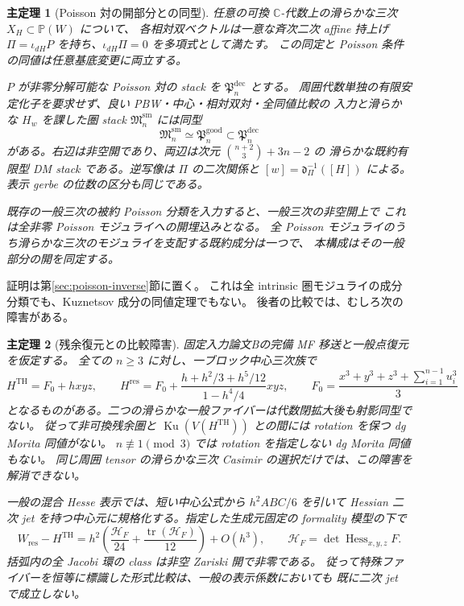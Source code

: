 \documentclass[11pt,a4paper]{ltjsarticle}
\numberwithin{equation}{section}
\newtheorem{maintheorem}{主定理}
\newcommand{\C}{\mathbb C}
\newcommand{\PP}{\mathbb P}
\begin{document}
\begin{maintheorem}[Poisson 対の開部分との同型]
任意の可換 $\C$-代数上の滑らかな三次 $X_H\subset\PP(W)$ について、
各相対双ベクトルは一意な斉次二次 affine 持上げ
$\Pi=\iota_{dH}P$ を持ち、$\iota_{dH}\Pi=0$ を多項式として満たす。
この同定と Poisson 条件の同値は任意基底変更に両立する。

$P$ が非零分解可能な Poisson 対の stack を $\mathfrak P_n^{\mathrm{dec}}$ とする。
周囲代数単独の有限安定化子を要求せず、良い PBW・中心・相対双対・全同値比較の
入力と滑らかな $H_w$ を課した圏 stack $\mathfrak M_n^{\mathrm{sm}}$ には同型
\[
 \mathfrak M_n^{\mathrm{sm}}\simeq
 \mathfrak P_n^{\mathrm{good}}\subset\mathfrak P_n^{\mathrm{dec}}
\]
がある。右辺は非空開であり、両辺は次元 $\binom{n+2}{3}+3n-2$ の
滑らかな既約有限型 DM stack である。逆写像は $\Pi$ の二次関係と
$[w]=\mathfrak d_\Pi^{-1}([H])$ による。表示 gerbe の位数の区分も同じである。

既存の一般三次の被約 Poisson 分類を入力すると、一般三次の非空開上で
これは全非零 Poisson モジュライへの開埋込みとなる。
全 Poisson モジュライのうち滑らかな三次のモジュライを支配する既約成分は一つで、
本構成はその一般部分の開を同定する。
\end{maintheorem}

証明は第\ref{sec:poisson-inverse}節に置く。
これは全 intrinsic 圏モジュライの成分分類でも、Kuznetsov 成分の同値定理でもない。
後者の比較では、むしろ次の障害がある。

\begin{maintheorem}[残余復元との比較障害]
固定入力論文Bの完備 MF 移送と一般点復元を仮定する。
全ての $n\ge3$ に対し、一ブロック中心三次族で
\[
 H^{\mathrm{TH}}=F_0+hxyz,\qquad
 H^{\mathrm{res}}=F_0+
 \frac{h+h^2/3+h^5/12}{1-h^4/4}xyz,\qquad
 F_0=\frac{x^3+y^3+z^3+\sum_{i=1}^{n-1}u_i^3}{3}
\]
となるものがある。二つの滑らかな一般ファイバーは代数閉拡大後も射影同型でない。
従って非可換残余圏と $\operatorname{Ku}(V(H^{\mathrm{TH}}))$ との間には
rotation を保つ dg Morita 同値がない。
$n\not\equiv1\pmod3$ では rotation を指定しない dg Morita 同値もない。
同じ周囲 tensor の滑らかな三次 Casimir の選択だけでは、この障害を解消できない。

一般の混合 Hesse 表示では、短い中心公式から $h^2ABC/6$ を引いて
Hessian 二次 jet を持つ中心元に規格化する。指定した生成元固定の formality 模型の下で
\[
 W_{\mathrm{res}}-H^{\mathrm{TH}}
 =h^2\left(\frac{\mathscr H_F}{24}
       +\frac{\operatorname{tr}(\mathscr H_F)}{12}\right)+O(h^3),
 \qquad \mathscr H_F=\det\operatorname{Hess}_{x,y,z}F.
\]
括弧内の全 Jacobi 環の class は非空 Zariski 開で非零である。
従って特殊ファイバーを恒等に標識した形式比較は、一般の表示係数においても
既に二次 jet で成立しない。
\end{maintheorem}
\end{document}
